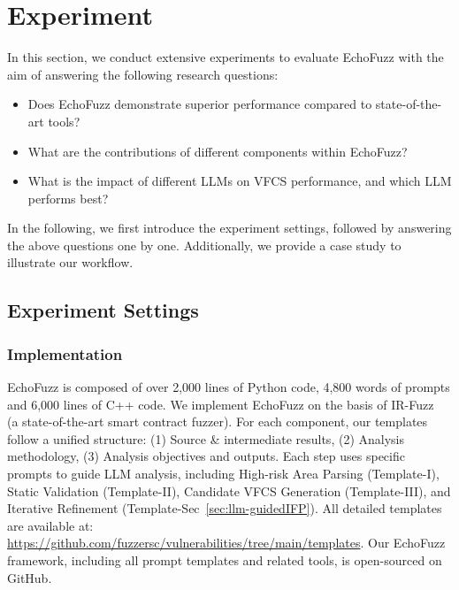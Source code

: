 \documentclass[sigconf]{acmart}
\newcommand{\ToolName}{\textcolor{ToolNameColor}{\textsf{{EchoFuzz}}}}
\begin{document}
\begin{sloppypar}
%
%

%
%

\section{Experiment}
%
\label{sec:experiments}

In this section, we conduct extensive experiments to evaluate \ToolName{} with the aim of answering the following research questions:

\begin{itemize}[wide=5pt, topsep=2pt, itemsep=2pt, leftmargin=\dimexpr{} + 7.2 \relax]
    \item[\textbf{RQ1.}] Does \ToolName{} demonstrate superior performance compared to state-of-the-art tools? 
    \item[\textbf{RQ2.}] What are the contributions of different components within \ToolName{}?
    \item[\textbf{RQ3.}] What is the impact of different LLMs on VFCS performance, and which LLM performs best?
\end{itemize}
In the following, we first introduce the experiment settings, followed by answering the above questions one by one. 
Additionally, we provide a case study to illustrate our workflow.


\subsection{Experiment Settings}

%
\subsubsection{Implementation} 
\ToolName{} is composed of over 2,000 lines of Python code, 4,800 words of prompts and 6,000 lines of C++ code. We implement \ToolName{} on the basis of IR-Fuzz~\cite{liu2023rethinking} (a state-of-the-art smart contract fuzzer).
For each component, our templates follow a unified structure: (1) Source \& intermediate results, (2) Analysis methodology, (3) Analysis objectives and outputs. Each step uses specific prompts to guide LLM analysis, including High-risk Area Parsing (Template-I), Static Validation (Template-II), Candidate VFCS Generation (Template-III), and Iterative Refinement (Template-Sec~\ref{sec:llm-guidedIFP}). All detailed templates are available at: \textcolor{blue}{\url{https://github.com/fuzzersc/vulnerabilities/tree/main/templates}}.
Our \ToolName{} framework, including all prompt templates and related tools, is open-sourced on GitHub.




\end{sloppypar}
\end{document}
